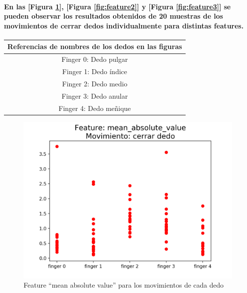 \documentclass{article}
\begin{document}
\paragraph{
En las [Figura \ref{fig:feature1}], [Figura \ref{fig:feature2}] y [Figura \ref{fig:feature3}] se pueden observar los resultados obtenidos de 20 muestras de los movimientos de cerrar dedos individualmente para distintas features.
}

\begin{center}
\begin{tabular}{ |c| }
\hline
    Referencias de nombres de los dedos en las figuras \\
\hline
    Finger 0: Dedo pulgar \\
    Finger 1: Dedo índice \\
    Finger 2: Dedo medio \\
    Finger 3: Dedo anular \\
    Finger 4: Dedo meñique \\
\hline
\end{tabular}
\end{center}

\begin{figure}[ht]
    \centering
    \includegraphics[width=\textwidth]{Figure_1.png}%
    \caption{Feature “mean absolute value” para los movimientos de cada dedo}
    \label{fig:feature1}
\end{figure}
\end{document}
